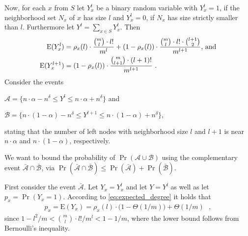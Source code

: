 \let\accentvec\vec \documentclass{llncs}
\newcommand{\keys}{\ensuremath{n}}
\newcommand{\cells}{\ensuremath{m}}
\newcommand{\pmf}{\ensuremath{{\rho}}}
\newcommand{\E}{\mathrm{E}}
\newcommand{\blank}{\text{ }}
\newcommand{\low}{\ensuremath{l}}
\newcommand{\evA}{{\mathcal{A}}}
\newcommand{\evB}{{\mathcal{B}}}
\begin{document}
Now, for each $x$ from $S$ let $Y^\low_x$ be a binary random variable
with $Y^\low_x=1$, if the neighborhood set $N_x$ of $x$ has size $\low$ and $Y^\low_x=0$, if $N_x$ has size strictly smaller than $\low$.
Furthermore let $Y^\low=\sum_{x\in S}Y^\low_x$. Then
\begin{align}
\label{eq:expected_degree}
 \E(Y^\low_x)
&=\pmf_x(\low)\cdot \frac{\binom{\cells}{\low}\cdot \low!}{ \cells^\low }
 +( 1-\pmf_x(\low))\cdot \frac{\binom{\cells}{\low}\cdot \low! \cdot \binom{\low+1}{2}}{\cells^{\low+1}} \text{, and} \\
 \E(Y^{\low+1}_x)&=( 1-\pmf_x(\low))\cdot \frac{\binom{\cells}{\low+1}\cdot (\low+1)!}{ \cells^{\low+1} }\notag \blank.
\end{align}
Consider the events
\begin{compactenum}
 \item $\evA=\{ \keys \cdot \alpha     -n^\delta \leq  Y^\low \leq \keys\cdot \alpha +n^\delta \}$ and
 \item $\evB=\{ \keys \cdot (1-\alpha) -n^\delta \leq  Y^{\low+1} \leq \keys\cdot(1- \alpha) +n^\delta \}$, 
 \end{compactenum}
stating that the number of left nodes with neighborhood size  $\low$ and $\low +1$ is near $\keys \cdot \alpha$ and $\keys \cdot (1-\alpha)$, respectively.

We want to bound the probability of $\Pr(\evA \cup \evB)$ using the complementary event $\bar{\evA} \cap \bar{\evB}$,
via $\Pr( \bar{\evA} \cap \bar{\evB})\leq \Pr(\bar{\evA})+\Pr(\bar{\evB})$.

First consider the event $\bar{\evA}$. Let $Y_x=Y^\low_x$ and let $Y=Y^\low$ as well as let $p_x=\Pr(Y_x=1)$.
According to \eqref{eq:expected_degree} it holds that 
\begin{align*}
p_x=\E(Y_x)=\pmf_x(\low) \cdot \big( 1-\Theta(1/\cells) \big) + \Theta(1/\cells) \blank,
\end{align*}
since  $1-{\low^2}/{\cells}<{\binom{\cells}{\low}\cdot \low!}/{ \cells^\low }< 1-{1}/{\cells}$,
where the lower bound follows from Bernoulli's inequality.
\end{document}
